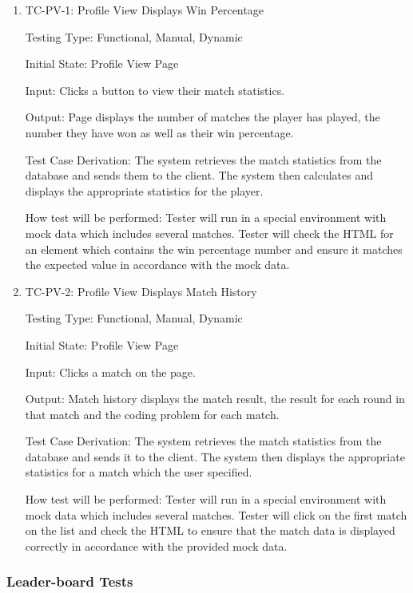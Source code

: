 \documentclass[12pt, titlepage]{article}
\begin{document}
\begin{enumerate}
\item {TC-PV-1: Profile View Displays Win Percentage}

Testing Type: Functional, Manual, Dynamic
					
Initial State: Profile View Page
					
Input: Clicks a button to view their match statistics.
					
Output: Page displays the number of matches the player has played, the number they have won as well as their win percentage.

Test Case Derivation: The system retrieves the match statistics from the database and sends them to the client. The system then calculates and displays the appropriate statistics for the player.
					
How test will be performed: Tester will run in a special environment with mock data which includes several matches. Tester will check the HTML for an element which contains the win percentage number and ensure it matches the expected value in accordance with the mock data.

\item {TC-PV-2: Profile View Displays Match History}

Testing Type: Functional, Manual, Dynamic
					
Initial State: Profile View Page
					
Input: Clicks a match on the page.
					
Output: Match history displays the match result, the result for each round in that match and the coding problem for each match.

Test Case Derivation: The system retrieves the match statistics from the database and sends it to the client. The system then displays the appropriate statistics for a match which the user specified.
					
How test will be performed: Tester will run in a special environment with mock data which includes several matches. Tester will click on the first match on the list and check the HTML to ensure that the match data is displayed correctly in accordance with the provided mock data.

\end{enumerate}

\subsubsection{Leader-board Tests}
\end{document}
